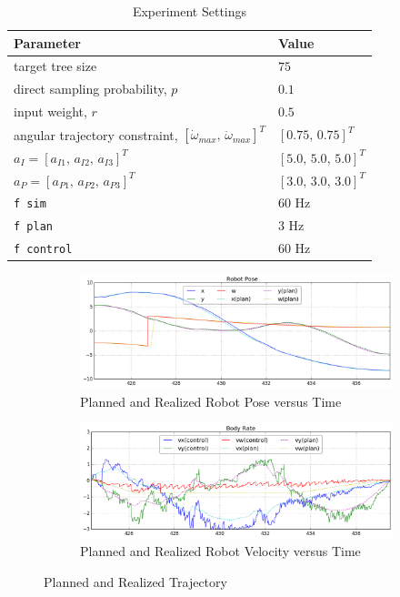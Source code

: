 \documentclass[conference]{IEEEtran}
\newcommand{\vars}{\texttt}
\begin{document}
\begin{table}[ht!]
\caption{Experiment Settings}
\label{online_exp_settings}
\centering
\begin{tabular}{|l|l|}
\hline
Parameter                                      & Value                 \\ \hline
target tree size                               & $75$                  \\ \hline
direct sampling probability, $p$               & $0.1$                 \\ \hline
input weight, $r$                              & $0.5$                 \\ \hline
angular trajectory constraint, $[\dot{\omega}_{max},\,\ddot{\omega}_{max}]^T$ & $[0.75,\,0.75]^T$     \\ \hline
$a_I = [a_{I1},\,a_{I2},\,a_{I3}]^T$                 & $[5.0,\,5.0,\,5.0]^T$ \\ \hline
$a_P = [a_{P1},\,a_{P2},\,a_{P3}]^T$                 & $[3.0,\,3.0,\,3.0]^T$ \\ \hline
\vars{f sim}								& $60$ Hz                 \\ \hline
\vars{f plan}								& $3$ Hz                 \\ \hline
\vars{f control}							& $60$ Hz                 \\ \hline
\end{tabular}
\end{table}

\begin{figure}[ht!]
	\begin{subfigure}{0.45\textwidth}
		\centering
		\includegraphics[width=1\linewidth]{assets/exppos}
		\caption{Planned and Realized Robot Pose versus Time}
		\label{exp_plot:pos}
	\end{subfigure}
	\begin{subfigure}{0.45\textwidth}
		\centering
		\includegraphics[width=1\linewidth]{assets/expvel}
		\caption{Planned and Realized Robot Velocity versus Time}
		\label{exp_plot:vel}
	\end{subfigure}	
	\centering
	\caption{Planned and Realized Trajectory}
	\label{exp_plot}
\end{figure}
\end{document}
